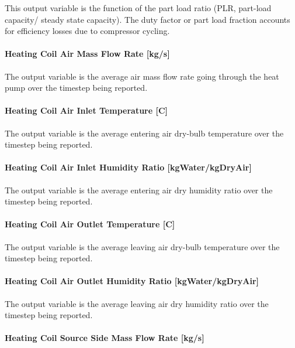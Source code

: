 This output variable is the function of the part load ratio (PLR, part-load capacity/ steady state capacity). The duty factor or part load fraction accounts for efficiency losses due to compressor cycling.

\paragraph{Heating Coil Air Mass Flow Rate {[}kg/s{]}}\label{heating-coil-air-mass-flow-rate-kgs-1}

The output variable is the average air mass flow rate going through the heat pump over the timestep being reported.

\paragraph{Heating Coil Air Inlet Temperature {[}C{]}}\label{heating-coil-air-inlet-temperature-c-1}

The output variable is the average entering air dry-bulb temperature over the timestep being reported.

\paragraph{Heating Coil Air Inlet Humidity Ratio {[}kgWater/kgDryAir{]}}\label{heating-coil-air-inlet-humidity-ratio-kgwaterkgdryair-1}

The output variable is the average entering air dry humidity ratio over the timestep being reported.

\paragraph{Heating Coil Air Outlet Temperature {[}C{]}}\label{heating-coil-air-outlet-temperature-c-1}

The output variable is the average leaving air dry-bulb temperature over the timestep being reported.

\paragraph{Heating Coil Air Outlet Humidity Ratio {[}kgWater/kgDryAir{]}}\label{heating-coil-air-outlet-humidity-ratio-kgwaterkgdryair-1}

The output variable is the average leaving air dry humidity ratio over the timestep being reported.

\paragraph{Heating Coil Source Side Mass Flow Rate {[}kg/s{]}}\label{heating-coil-source-side-mass-flow-rate-kgs}

